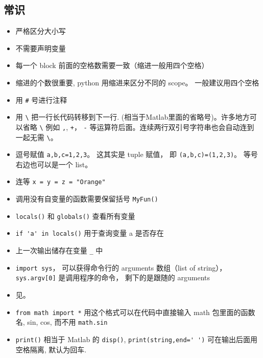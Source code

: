 
\begin{issues}
\issueDraft
\end{issues}


\subsection{常识}
\begin{itemize}
\item 严格区分大小写
\item 不需要声明变量
\item 每一个 block 前面的空格数需要一致（缩进一般用四个空格）
\item 缩进的个数很重要, python 用缩进来区分不同的 scope。 一般建议用四个空格
\item 用 \verb`#` 号进行注释
\item 用 \verb`\` 把一行长代码转移到下一行. (相当于Matlab里面的省略号)。许多地方可以省略 \verb`\` 例如 \verb`,`, \verb`+`， \verb`-` 等运算符后面。连续两行双引号字符串也会自动连到一起无需 \verb`\`。
\item 逗号赋值 \verb`a,b,c=1,2,3`。 这其实是 tuple 赋值， 即 \verb`(a,b,c)=(1,2,3)`。 等号右边也可以是一个 list。
\item 连等 \verb`x = y = z = "Orange"`
\item 调用没有自变量的函数需要保留括号  \verb`MyFun()`
\item \verb`locals()` 和 \verb`globals()` 查看所有变量
\item \verb`if 'a' in locals()` 用于查询变量 a 是否存在
\item 上一次输出储存在变量 \verb`_` 中
\item \verb`import sys`， 可以获得命令行的 arguments 数组（list of string）， \verb`sys.argv[0]` 是调用程序的命令， 剩下的是跟随的 arguments
\item 见。
\item \verb`from math import *` 用这个格式可以在代码中直接输入 math 包里面的函数名, sin, cos, 而不用 \verb`math.sin`
\item \verb`print()` 相当于 Matlab 的 \verb`disp()`, \verb`print(string,end=' ')` 可在输出后面用空格隔离, 默认为回车. 
\end{itemize}

